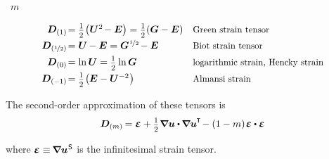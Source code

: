 \vspace{.1em} \noindent {}~$m$

\nopagebreak\begin{equation*}
\begin{array}{r@{\hspace{0.1em}}ll}
\bm{D}_{(1)} & = \smalldisplaystyleonehalf \hspace{-0.25ex} \left( \bm{U}^{2} \hspace{-0.25ex} - \bm{E} \right) = \smalldisplaystyleonehalf (\bm{G} - \bm{E}) & \text{\scalebox{0.92}[0.92]{Green strain tensor}}
\\[.4em]
\bm{D}_{(\nicefrac{1}{2})} & = \bm{U} \hspace{-0.15ex} - \bm{E} = \bm{G}^{\hspace{.1ex}\nicefrac{1}{2}} \hspace{-0.25ex} - \bm{E} & \text{\scalebox{0.92}[0.92]{Biot strain tensor}}
\\[.4em]
\bm{D}_{(0)} & = \ln \bm{U} = \smalldisplaystyleonehalf \ln \bm{G} & \text{\scalebox{0.92}[0.92]{logarithmic strain, Hencky strain}}
\\[.4em]
\bm{D}_{(-\hspace{-0.1ex}1)} & = \smalldisplaystyleonehalf \hspace{-0.25ex} \left( \hspace{-0.1ex} \bm{E} - \bm{U}^{-2} \hspace{.1ex} \right) & \text{\scalebox{0.92}[0.92]{Almansi strain}}
\end{array}
\end{equation*}

The second\hbox{-}order approximation of these tensors is
\[ \bm{D}_{(m)} \hspace{-0.2ex} =
\mathboldepsilon
+ \smalldisplaystyleonehalf \hspace{.1ex} \boldnabla\bm{u} \dotp \hspace{-0.1ex} \boldnabla\bm{u}^{\hspace{-0.1ex}\T} \hspace{-0.3ex}
- (1 - m) \hspace{0.2ex} \mathboldepsilon \dotp \mathboldepsilon \]

\vspace{-0.25em} \noindent where ${\mathboldepsilon \equiv \hspace{-0.2ex} \boldnabla {\bm{u}}^{\hspace{.1ex}\mathsf{S}}}$ is the infinitesimal strain tensor.

